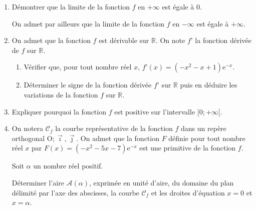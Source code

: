 \documentclass[10pt]{article}
\providecommand{\R}{\mathbb{R}}
\providecommand{\e}{{\mathrm{e}}}
\providecommand{\Oij}{\(\mathrm{O};\vec{\imath},\vec{\jmath}\)}
\begin{document}
\begin{enumerate}
\item Démontrer que la limite de la fonction $f$ en $+\infty$ est égale à 0.

On admet par ailleurs que la limite de la fonction $f$ en $-\infty$ est égale à $+\infty$.

\item On admet que la fonction $f$ est dérivable sur $\R$. On note $f’$ la fonction dérivée de $f$ sur $\R$.
	\begin{enumerate}
		\item Vérifier que, pour tout nombre réel $x$, $f’(x)=\left(-x^{2}-x+1\right) \e^{-x}$.
		\item Déterminer le signe de la fonction dérivée $f’$ sur $\R$ puis en déduire les variations de la fonction $f$ sur $\R$.
	\end{enumerate}
\item Expliquer pourquoi la fonction $f$ est positive sur l'intervalle $[0;+\infty[$.
\item On notera $\mathcal{C}_{f}$ la courbe représentative de la fonction $f$ dans un repère orthogonal \Oij. On admet que la fonction $F$ définie pour tout nombre réel $x$ par $F(x)=\left(-x^{2}-5 x-7\right) \e^{-x}$ est une primitive de la fonction $f$.

Soit $\alpha$ un nombre réel positif.

Déterminer l'aire $\mathcal{A}(\alpha)$, exprimée en unité d'aire, du domaine du plan délimité par l'axe des abscisses, la courbe $\mathcal{C}_{f}$ et les droites d'équation $x=0$ et $x=\alpha$.
\end{enumerate}
\end{document}
